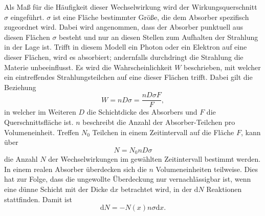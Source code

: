 Als Maß für die Häufigkeit dieser Wechselwirkung wird der Wirkungsquerschnitt $\sigma$ eingeführt.
$\sigma$ ist eine Fläche bestimmter Größe, die dem Absorber spezifisch zugeordnet wird. 
Dabei wird angenommen, dass der Absorber punktuell aus diesen Flächen $\sigma$ besteht und nur an diesen Stellen zum Aufhalten der Strahlung in der Lage ist.
Trifft in diesem Modell ein Photon oder ein Elektron auf eine dieser Flächen, wird es absorbiert; andernfalls durchdringt die Strahlung die Materie unbeeinflusst.
Es wird die Wahrscheinlichkeit $W$ beschrieben, mit welcher ein eintreffendes Strahlungsteilchen auf eine dieser Flächen trifft. 
Dabei gilt die Beziehung 
\begin{equation}
	W=n D \sigma =\frac{n D \sigma F}{F},
\end{equation}
in welcher im Weiteren $D$ die Schichtdicke des Absorbers und $F$ die Querschnittsfläche ist. 
$n$ beschreibt die Anzahl der Absorber-Teilchen pro Volumeneinheit.
Treffen $N_0$ Teilchen in einem Zeitintervall auf die Fläche $F$, kann über
\begin{equation}
	N=N_0 n D \sigma
\end{equation}
die Anzahl $N$ der Wechselwirkungen im gewählten Zeitintervall bestimmt werden. 
In einem realen Absorber überdecken sich die $n$ Volumeneinheiten teilweise. 
Dies hat zur Folge, dass die ungewollte Überdeckung nur vernachlässigbar ist, wenn eine dünne Schicht mit der Dicke $\mathup{d}x$ betrachtet wird, in der $\mathup{d}N$ Reaktionen stattfinden. 
Damit ist
\begin{equation}
	\mathup{d}N=-N(x)  n \sigma \mathup{d}x.
	\label{eq:Absorptionsgesetz_Vorstufe}
\end{equation}

